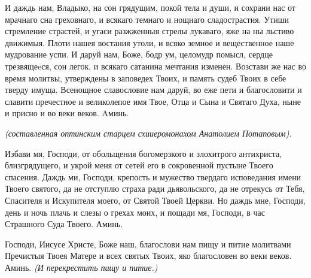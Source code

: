 \longpage{}\mychapterending

 


И даждь нам, Владыко, на сон грядущим, покой тела и души, и сохрани нас от мрачнаго сна греховнаго, и всякаго темнаго и нощнаго сладострастия. Утиши стремление страстей, и угаси разжженныя стрелы лукаваго, яже на ны льстиво движимыя. Плоти нашея востания утоли, и всяко земное и вещественное наше мудрование успи. И даруй нам, Боже, бодр ум, целомудр помысл, сердце трезвящеeся, сон легок, и всякаго сатанина мечтания изменен. Возстави же нас во время молитвы, утверждены в заповедех Твоих, и память судеб Твоих в себе тверду имуща. Всенощное славословие нам даруй, во еже пети и благословити и славити пречестное и великолепое имя Твое, Отца и Сына и Святаго Духа, ныне и присно и во веки веков. Aминь.



\nopagebreak\bigskip\bigskip\mychapterending

 



\itshape (составленная оптинским старцем схииеромонахом Анатолием Потаповым).\normalfont{}



Избави мя, Господи, от обольщения богомерзкого и злохитрого антихриста, близгрядущего, и укрой меня от сетей его в сокровенной пустыне Твоего спасения. Даждь ми, Господи, крепость и мужество твердаго исповедания имени Твоего святого, да не отступлю страха ради дьявольского, да не отрекусь от Тебя, Спасителя и Искупителя моего, от Святой Твоей Церкви. Но даждь мне, Господи, день и ночь плачь и слезы о грехах моих, и пощади мя, Господи, в час Страшного Суда Твоего. Аминь.


\itshape \normalfont{}


 
\nopagebreak\bigskip\bigskip\mychapterending

 



Господи, Иисусе Христе, Боже наш, благослови нам пищу и питие молитвами Пречистыя Твоея Матере и всех святых Твоих, яко благословен во веки веков. Аминь. \itshape (И перекрестить пищу и питие.)\normalfont{}




